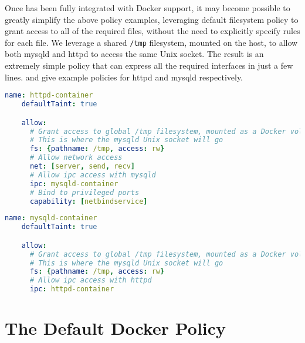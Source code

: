 Once \bpfcontain{} has been fully integrated with Docker support, it may become possible
to greatly simplify the above policy examples, leveraging default filesystem policy to
grant access to all of the required files, without the need to explicitly specify rules
for each file. We leverage a shared \texttt{/tmp} filesystem, mounted on the host, to
allow both mysqld and httpd to access the same Unix socket. The result is an extremely
simple policy that can express all the required interfaces in just a few lines.
 and  give example
policies for httpd and mysqld respectively.

\begin{lstlisting}[language=yaml, gobble=4, float=false, caption={[A simplified \bpfcontain{} policy for Apache httpd]
  A simplified \bpfcontain{} policy for Apache httpd running in a Docker container,
  leveraging future support for automatic filesystem policy.
  %\todo{Describe this}
}, label={lst:bpfcontain-httpd-next}]
    name: httpd-container
    defaultTaint: true

    allow:
      # Grant access to global /tmp filesystem, mounted as a Docker volume
      # This is where the mysqld Unix socket will go
      fs: {pathname: /tmp, access: rw}
      # Allow network access
      net: [server, send, recv]
      # Allow ipc access with mysqld
      ipc: mysqld-container
      # Bind to privileged ports
      capability: [netbindservice]
\end{lstlisting}

\begin{lstlisting}[language=yaml, gobble=4, float=false, caption={[A simplified \bpfcontain{} policy for MySQL]
  A simplified \bpfcontain{} policy for MySQL running in a Docker container, leveraging
  future support for automatic filesystem policy.
  %\todo{Describe this}
}, label={lst:bpfcontain-mysqld-next}]
    name: mysqld-container
    defaultTaint: true

    allow:
      # Grant access to global /tmp filesystem, mounted as a Docker volume
      # This is where the mysqld Unix socket will go
      fs: {pathname: /tmp, access: rw}
      # Allow ipc access with httpd
      ipc: httpd-container
\end{lstlisting}


\section{The Default Docker Policy}

